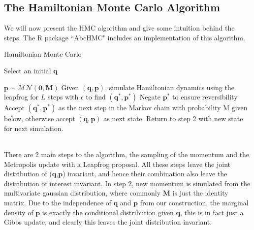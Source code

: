 \documentclass[11pt]{article}
\begin{document}


\pagebreak
\subsection{The Hamiltonian Monte Carlo Algorithm}
We will now present the HMC algorithm and give some intuition behind the steps. The R package ``AbcHMC" includes an implementation of this algorithm. 
\begin{algorithm}
\caption{Hamiltonian Monte Carlo}\label{euclid}
\begin{algorithmic}[1] 
\State Select an initial $\mathbf{q}$ 

\State $\mathbf{p}\sim \mathcal{MN}(\mathbf{0},\mathbf{M})$
\State Given $(\mathbf{q},\mathbf{p})$, simulate Hamiltonian dynamics using the leapfrog for $L$ steps with $\epsilon$ to find $(\mathbf{q^{*}},\mathbf{p^{*}})$ 
\State Negate $\mathbf{p^{*}}$ to ensure reversibility 
\State Accept $(\mathbf{q^{*}}, \mathbf{p^{*}})$ as the next step in the Markov chain with probability M given below, otherwise accept $(\mathbf{q},\mathbf{p})$ as next state.
\State Return to step 2 with new state for next simulation.
\end{algorithmic}
\end{algorithm}\\
\noindent There are 2 main steps to the algorithm, the sampling of the momentum and the Metropolis update with a Leapfrog proposal. All these steps leave the joint distribution of ($\mathbf{q}$,$\mathbf{p}$) invariant, and hence their combination also leave the distribution of interest invariant. In step 2, new momentum is simulated from the multivariate gaussian distribution, where commonly $\mathbf{M}$ is just the identity matrix. Due to the independence of $\mathbf{q}$ and $\mathbf{p}$ from our construction, the marginal density of $\mathbf{p}$ is exactly the conditional distribution given $\mathbf{q}$, this is in fact just a Gibbs update, and clearly this leaves the joint distribution invariant. 
\\
\end{document}
